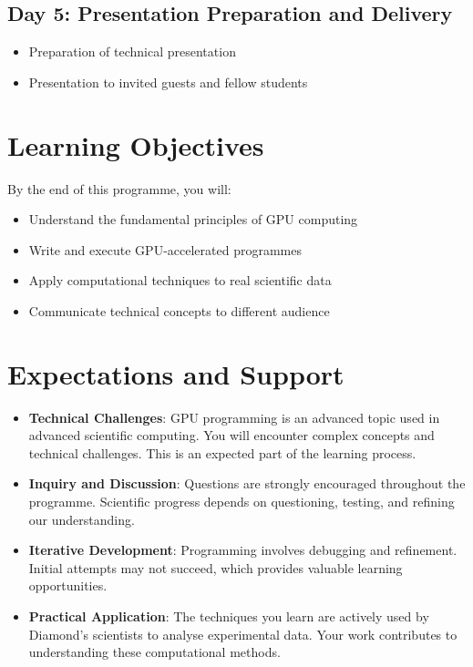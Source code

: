 \documentclass[11pt, a4paper]{article}
\begin{document}
\subsection*{Day 5: Presentation Preparation and Delivery}
\begin{itemize}
    \item Preparation of technical presentation
    \item Presentation to invited guests and fellow students
\end{itemize}

\section*{Learning Objectives}

By the end of this programme, you will:
\begin{itemize}
    \item Understand the fundamental principles of GPU computing
    \item Write and execute GPU-accelerated programmes
    \item Apply computational techniques to real scientific data
    \item Communicate technical concepts to different audience
\end{itemize}

\section*{Expectations and Support}

\begin{itemize}
    \item \textbf{Technical Challenges}: GPU programming is an advanced topic used in advanced scientific computing. You will encounter complex concepts and technical challenges. This is an expected part of the learning process.
\item \textbf{Inquiry and Discussion}: Questions are strongly encouraged throughout the programme. Scientific progress depends on questioning, testing, and refining our understanding.
\item \textbf{Iterative Development}: Programming involves debugging and refinement. Initial attempts may not succeed, which provides valuable learning opportunities.
\item \textbf{Practical Application}: The techniques you learn are actively used by Diamond's scientists to analyse experimental data. Your work contributes to understanding these computational methods.
\end{itemize}
\end{document}
